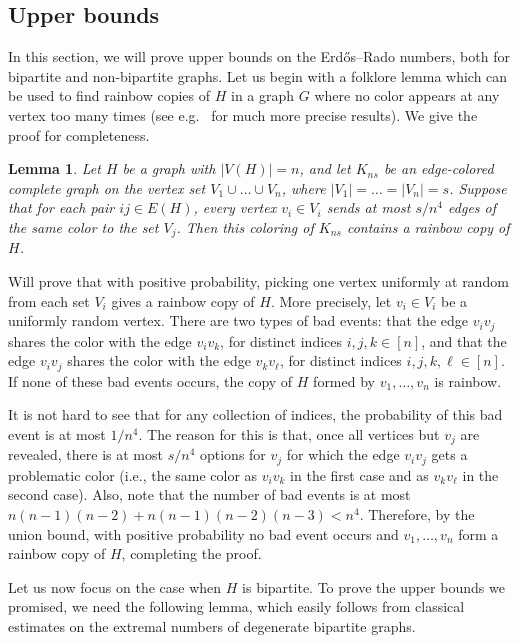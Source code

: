 \documentclass[a4paper,11pt]{article}
\makeatletter
\renewenvironment{proof}[1][\proofname] {\par\pushQED{\qed}\normalfont\topsep6\p@\@plus6\p@\relax\trivlist\item[\hskip\labelsep\bfseries#1\@addpunct{.}]\ignorespaces}{\popQED\endtrivlist\@endpefalse}
\newtheorem{lemma}[theorem]{\bf Lemma}
\theoremstyle{definition}
\makeatother
\begin{document}
\subsection{Upper bounds}

In this section, we will prove upper bounds on the Erd\H{o}s--Rado numbers, both for bipartite and non-bipartite graphs. Let us begin with a folklore lemma which can be used to find rainbow copies of $H$ in a graph $G$ where no color appears at any vertex too many times (see e.g.\ \cite{MR2016871} for much more precise results). We give the proof for completeness.

\begin{lemma}\label{lemma:sparsity at every vertex implies rainbow copies}
Let $H$ be a graph with $|V(H)|=n$, and let $K_{ns}$ be an edge-colored complete graph on the vertex set $V_1\cup\dots\cup V_n$, where $|V_1|=\dots=|V_n|=s$. Suppose that for each pair $ij\in E(H)$, every vertex $v_i\in V_i$ sends at most $s/n^4$ edges of the same color to the set $V_j$. Then this coloring of $K_{ns}$ contains a rainbow copy of $H$.
\end{lemma}
\begin{proof}
Will prove that with positive probability, picking one vertex uniformly at random from each set $V_i$ gives a rainbow copy of $H$. More precisely, let $v_i\in V_i$ be a uniformly random vertex. There are two types of bad events: that the edge $v_iv_j$ shares the color with the edge $v_iv_k$, for distinct indices $i, j, k\in [n]$, and that the edge $v_iv_j$ shares the color with the edge $v_kv_\ell$, for distinct indices $i, j, k, \ell\in [n]$. If none of these bad events occurs, the copy of $H$ formed by $v_1, \dots, v_n$ is rainbow.

It is not hard to see that for any collection of indices, the probability of this bad event is at most $1/n^4$. The reason for this is that, once all vertices but $v_j$ are revealed, there is at most $s/n^4$ options for $v_j$ for which the edge $v_iv_j$ gets a problematic color (i.e., the same color as $v_iv_k$ in the first case and as $v_kv_{\ell}$ in the second case). Also, note that the number of bad events is at most $n(n-1)(n-2)+n(n-1)(n-2)(n-3)<n^4$. Therefore, by the union bound, with positive probability no bad event occurs and $v_1, \dots, v_n$ form a rainbow copy of $H$, completing the proof.
\end{proof}

Let us now focus on the case when $H$ is bipartite. To prove the upper bounds we promised, we need the following lemma, which easily follows from classical estimates on the extremal numbers of degenerate bipartite graphs.
\end{document}
